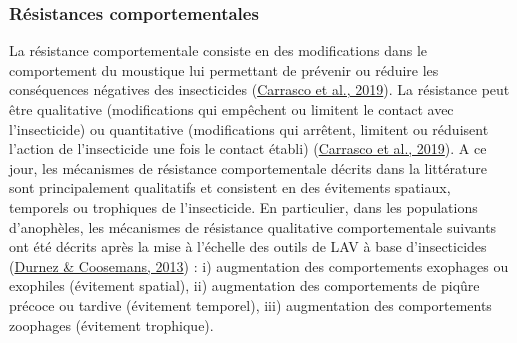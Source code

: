 \documentclass[12pt,twoside]{reedthesis}
\begin{document}
\hypertarget{behavioural-resistance}{%
\subsubsection{Résistances comportementales}\label{behavioural-resistance}}

La résistance comportementale consiste en des modifications dans le comportement du moustique lui permettant de prévenir ou réduire les conséquences négatives des insecticides (\protect\hyperlink{ref-carrasco_behavioural_2019}{Carrasco et al., 2019}). La résistance peut être qualitative (modifications qui empêchent ou limitent le contact avec l'insecticide) ou quantitative (modifications qui arrêtent, limitent ou réduisent l'action de l'insecticide une fois le contact établi) (\protect\hyperlink{ref-carrasco_behavioural_2019}{Carrasco et al., 2019}). A ce jour, les mécanismes de résistance comportementale décrits dans la littérature sont principalement qualitatifs et consistent en des évitements spatiaux, temporels ou trophiques de l'insecticide. En particulier, dans les populations d'anophèles, les mécanismes de résistance qualitative comportementale suivants ont été décrits après la mise à l'échelle des outils de LAV à base d'insecticides (\protect\hyperlink{ref-manguin_residual_2013}{Durnez \& Coosemans, 2013}) : i) augmentation des comportements exophages ou exophiles (évitement spatial), ii) augmentation des comportements de piqûre précoce ou tardive (évitement temporel), iii) augmentation des comportements zoophages (évitement trophique).\\
\end{document}

